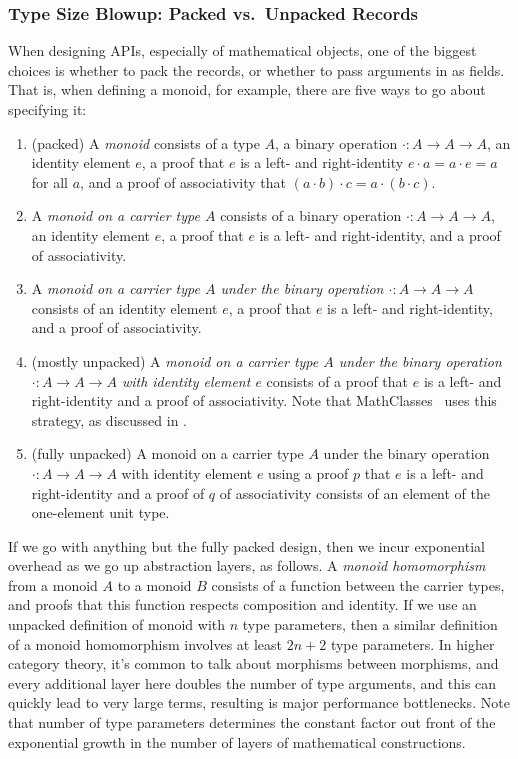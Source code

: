 \subsubsection{Type Size Blowup: Packed vs.\ Unpacked Records} \label{sec:abstraction-barriers:packed-records}
When designing APIs, especially of mathematical objects, one of the biggest choices is whether to pack the records, or whether to pass arguments in as fields.
That is, when defining a monoid, for example, there are five ways to go about specifying it:
\begin{enumerate}
    \item
    (packed)
    A \emph{monoid} consists of a type $A$, a binary operation $\cdot : A \to A \to A$, an identity element $e$, a proof that $e$ is a left- and right-identity $e \cdot a = a \cdot e = a$ for all $a$, and a proof of associativity that $(a \cdot b) \cdot c = a \cdot (b \cdot c)$.
    \item
    A \emph{monoid on a carrier type $A$} consists of a binary operation $\cdot : A \to A \to A$, an identity element $e$, a proof that $e$ is a left- and right-identity, and a proof of associativity.
    \item
    A \emph{monoid on a carrier type $A$ under the binary operation $\cdot : A \to A \to A$} consists of an identity element $e$, a proof that $e$ is a left- and right-identity, and a proof of associativity.
    \item
    (mostly unpacked)
    A \emph{monoid on a carrier type $A$ under the binary operation $\cdot : A \to A \to A$ with identity element $e$} consists of a proof that $e$ is a left- and right-identity and a proof of associativity.
    Note that MathClasses~\cite{MathClasses,Type2011Spitters,spitters2010developing} uses this strategy, as discussed in \textcite{Packaging2009Garillot}.
    \item
    (fully unpacked) A monoid on a carrier type $A$ under the binary operation $\cdot : A \to A \to A$ with identity element $e$ using a proof $p$ that $e$ is a left- and right-identity and a proof of $q$ of associativity consists of an element of the one-element unit type.
\end{enumerate}

If we go with anything but the fully packed design, then we incur exponential overhead as we go up abstraction layers, as follows.
A \emph{monoid homomorphism} from a monoid $A$ to a monoid $B$ consists of a function between the carrier types, and proofs that this function respects composition and identity.
If we use an unpacked definition of monoid with $n$ type parameters, then a similar definition of a monoid homomorphism involves at least $2n+2$ type parameters.
In higher category theory, it's common to talk about morphisms between morphisms, and every additional layer here doubles the number of type arguments, and this can quickly lead to very large terms, resulting is major performance bottlenecks.
Note that number of type parameters determines the constant factor out front of the exponential growth in the number of layers of mathematical constructions.

